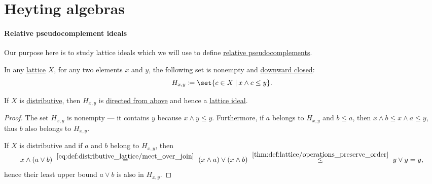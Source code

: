 \section{Heyting algebras}\label{sec:heyting_algebras}

\paragraph{Relative pseudocomplement ideals}\hfill

Our purpose here is to study lattice ideals which we will use to define \hyperref[def:heyting_algebra]{relative pseudocomplements}.

\begin{proposition}\label{thm:relative_pseudocomplement_set_is_ideal}
  In any \hyperref[def:lattice]{lattice} \( X \), for any two elements \( x \) and \( y \), the following set is nonempty and \hyperref[def:closed_ordered_subset]{downward closed}:
  \begin{equation*}
    H_{x,y} \coloneqq \set{ c \in X \given x \wedge c \leq y }.
  \end{equation*}

  If \( X \) is \hyperref[def:distributive_lattice]{distributive}, then \( H_{x,y} \) is \hyperref[def:directed_set]{directed from above} and hence a \hyperref[def:lattice_ideal]{lattice ideal}.
\end{proposition}
\begin{proof}
  The set \( H_{x,y} \) is nonempty --- it contains \( y \) because \( x \wedge y \leq y \). Furthermore, if \( a \) belongs to \( H_{x,y} \) and \( b \leq a \), then \( x \wedge b \leq x \wedge a \leq y \), thus \( b \) also belongs to \( H_{x,y} \).

  If \( X \) is distributive and if \( a \) and \( b \) belong to \( H_{x,y} \), then
  \begin{equation*}
    x \wedge (a \vee b)
    \reloset {\eqref{eq:def:distributive_lattice/meet_over_join}} =
    (x \wedge a) \vee (x \wedge b)
    \reloset {\ref{thm:def:lattice/operations_preserve_order}} \leq
    y \vee y
    =
    y,
  \end{equation*}
  hence their least upper bound \( a \vee b \) is also in \( H_{x,y} \).
\end{proof}

